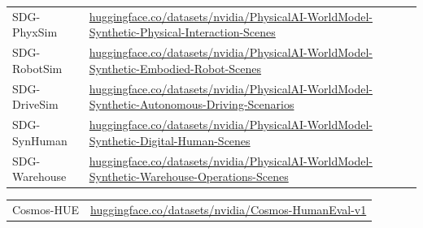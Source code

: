 \begin{tcolorbox}[
    colback=black!2,
    colframe=nvidiagreen!75!white,
    boxrule=0.4pt,
    arc=1pt,
    left=4pt,
    right=4pt,
    top=4pt,
    bottom=4pt,
    title=Open Synthetic Dataset
]
\small
\begin{tabular}{p{4.5cm}l}
SDG-PhyxSim & {\normalfont\scriptsize\href{https://huggingface.co/datasets/nvidia/PhysicalAI-WorldModel-Synthetic-Physical-Interaction-Scenes}{huggingface.co/datasets/nvidia/PhysicalAI-WorldModel-Synthetic-Physical-Interaction-Scenes}} \\
SDG-RobotSim & {\normalfont\scriptsize\href{https://huggingface.co/datasets/nvidia/PhysicalAI-WorldModel-Synthetic-Embodied-Robot-Scenes}{huggingface.co/datasets/nvidia/PhysicalAI-WorldModel-Synthetic-Embodied-Robot-Scenes}} \\
SDG-DriveSim & {\normalfont\scriptsize\href{https://huggingface.co/datasets/nvidia/PhysicalAI-WorldModel-Synthetic-Autonomous-Driving-Scenarios}{huggingface.co/datasets/nvidia/PhysicalAI-WorldModel-Synthetic-Autonomous-Driving-Scenarios}} \\
SDG-SynHuman & {\normalfont\scriptsize\href{https://huggingface.co/datasets/nvidia/PhysicalAI-WorldModel-Synthetic-Digital-Human-Scenes}{huggingface.co/datasets/nvidia/PhysicalAI-WorldModel-Synthetic-Digital-Human-Scenes}} \\
SDG-Warehouse & {\normalfont\scriptsize\href{https://huggingface.co/datasets/nvidia/PhysicalAI-WorldModel-Synthetic-Warehouse-Operations-Scenes}{huggingface.co/datasets/nvidia/PhysicalAI-WorldModel-Synthetic-Warehouse-Operations-Scenes}} \\
\end{tabular}
\end{tcolorbox}

\begin{tcolorbox}[
    colback=black!2,
    colframe=nvidiagreen!75!white,
    boxrule=0.4pt,
    arc=1pt,
    left=4pt,
    right=4pt,
    top=4pt,
    bottom=4pt,
    title=Open Evaluation Benchmark
]
\small
\begin{tabular}{p{4.5cm}l}
Cosmos-HUE & {\normalfont\scriptsize\href{https://huggingface.co/datasets/nvidia/Cosmos-HumanEval-v1}{huggingface.co/datasets/nvidia/Cosmos-HumanEval-v1}} \\
\end{tabular}
\end{tcolorbox}
